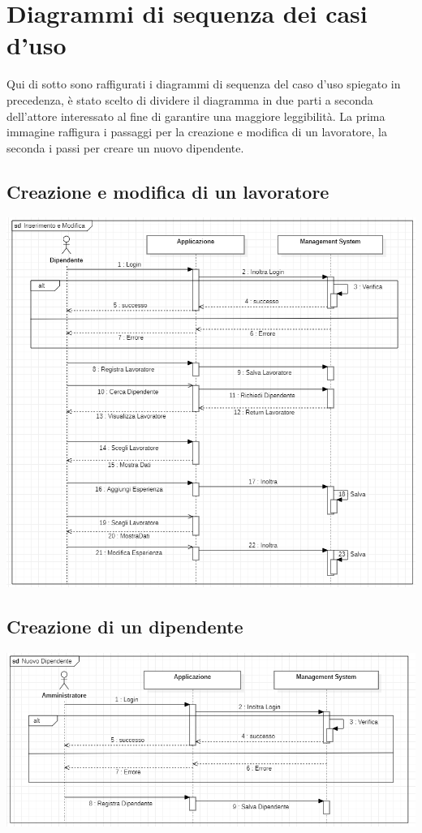 \documentclass[ 4paper,11pt,openany]{book}
\begin{document}
\section{Diagrammi di sequenza dei casi d'uso}
Qui di sotto sono raffigurati i diagrammi di sequenza del caso d'uso spiegato in precedenza, è stato scelto di dividere il diagramma in due parti a seconda dell'attore interessato al fine di garantire una maggiore leggibilità. La prima immagine raffigura i passaggi per la creazione e modifica di un lavoratore, la seconda i passi per creare un nuovo dipendente.
\subsection{Creazione e modifica di un lavoratore}
\includegraphics[width=180mm]{seq.png}
\subsection{Creazione di un dipendente}
\includegraphics[width=180mm]{seq2.png}
\end{document}

